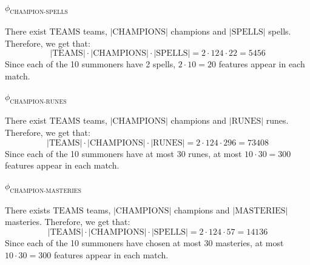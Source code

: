 \paragraph{$\phi_{\text{CHAMPION-SPELLS}}$}
\begin{adjustwidth}{2cm}{}
There exist $\text{TEAMS}$ teams, $|\text{CHAMPIONS}|$ champions and $|\text{SPELLS}|$ spells. Therefore, we get that:
\[|\text{TEAMS}| \cdot |\text{CHAMPIONS}| \cdot |\text{SPELLS}| = 2 \cdot 124 \cdot 22 = 5456\]
Since each of the 10 summoners have 2 spells, $2 \cdot 10 = 20$ features appear in each match.
\end{adjustwidth}

\paragraph{$\phi_{\text{CHAMPION-RUNES}}$}
\begin{adjustwidth}{2cm}{}
There exist $\text{TEAMS}$ teams, $|\text{CHAMPIONS}|$ champions and $|\text{RUNES}|$ runes. Therefore, we get that:
\[|\text{TEAMS}| \cdot |\text{CHAMPIONS}| \cdot |\text{RUNES}| = 2 \cdot 124 \cdot 296 = 73408\]
Since each of the 10 summoners have at most 30 runes, at most $10 \cdot 30 = 300$ features appear in each match.
\end{adjustwidth}

\paragraph{$\phi_{\text{CHAMPION-MASTERIES}}$}
\begin{adjustwidth}{2cm}{}
There exists $\text{TEAMS}$ teams, $|\text{CHAMPIONS}|$ champions and $|\text{MASTERIES}|$ masteries. Therefore, we get that:
\[|\text{TEAMS}| \cdot |\text{CHAMPIONS}| \cdot |\text{SPELLS}| = 2 \cdot 124 \cdot 57 = 14136\]
Since each of the 10 summoners have chosen at most 30 masteries, at most $10 \cdot 30 = 300$ features appear in each match.
\end{adjustwidth}

